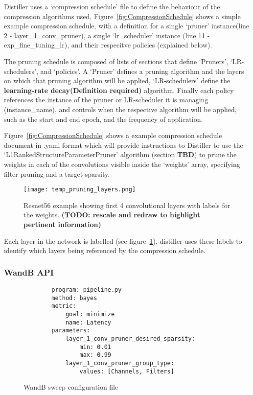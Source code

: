 \documentclass[../Dissertation.tex]{subfiles}
\begin{document}
Distiller uses a `compression schedule' file to define the behaviour of the compression algorithms used, Figure~\ref{fig:CompressionSchedule} shows a simple example compression schedule, with a definition for a single `pruner' instance(line 2 - layer\_1\_conv\_pruner), a single `lr\_scheduler' instance (line 11 - exp\_fine\_tuning\_lr), and their respecitve policies (explained below).


The pruning schedule is composed of lists of sections that define `Pruners', `LR-schedulers', and `policies'. A `Pruner' defines a pruning algorithm and the layers on which that pruning algorithm will be applied, `LR-schedulers' define the \textbf{learning-rate decay(Definition required)} algorithm. 
Finally each policy references the instance of the pruner or LR-scheduler it is managing (instance\_name), and controls when the respective algorithm will be applied, such as the start and end epoch, and the frequency of application.

Figure~\ref{fig:CompressionSchedule} shows a example compression schedule document in .yaml format which will provide instructions to Distiller to use the `L1RankedStructureParameterPruner' algorithm (section \textbf{TBD}) to prune the weights in each of the convolutions visible inside the `weights' array, specifying filter pruning and a target sparsity.

\begin{figure}[H]
    \texttt{[image: temp\_pruning\_layers.png]}
    \caption{Resnet56 example showing first 4 convolutional layers with labels for the weights. \textbf{(TODO: rescale and redraw to highlight pertinent information)}}
    \label{fig:resnet56weightlabels}
\end{figure}

Each layer in the network is labelled (see figure~\ref{fig:resnet56weightlabels}), distiller uses these labels to identify which layers being referenced by the compression schedule. 


\newpage
\subsubsection{WandB API}

\singlespacing
\begin{figure}[H]
    \begin{verbatim}
        program: pipeline.py
        method: bayes
        metric:
            goal: minimize
            name: Latency
        parameters:
            layer_1_conv_pruner_desired_sparsity:
                min: 0.01
                max: 0.99
            layer_1_conv_pruner_group_type:
                values: [Channels, Filters]
    \end{verbatim}
    \caption{WandB sweep configuration file}
    \label{fig:sweepConfig}
\end{figure}
\doublespacing
\end{document}
